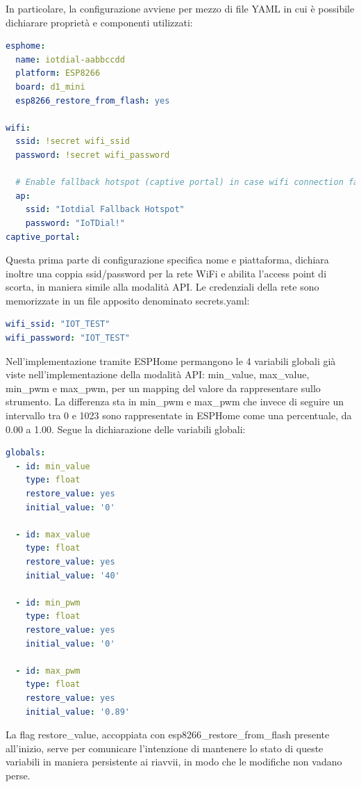 \documentclass[12pt,a4paper]{report}
\begin{document}
In particolare, la configurazione avviene per mezzo di file YAML in cui è possibile dichiarare proprietà e componenti utilizzati:

\begin{lstlisting}[language=yaml]
esphome:
  name: iotdial-aabbccdd
  platform: ESP8266
  board: d1_mini
  esp8266_restore_from_flash: yes

wifi:
  ssid: !secret wifi_ssid
  password: !secret wifi_password

  # Enable fallback hotspot (captive portal) in case wifi connection fails
  ap:
    ssid: "Iotdial Fallback Hotspot"
    password: "IoTDial!"
captive_portal:
\end{lstlisting}
Questa prima parte di configurazione specifica nome e piattaforma, dichiara inoltre una coppia ssid/password per la rete WiFi
e abilita l'access point di scorta, in maniera simile alla modalità API. Le credenziali della rete sono memorizzate in un file apposito
denominato secrets.yaml:
\begin{lstlisting}[language=yaml]
wifi_ssid: "IOT_TEST"
wifi_password: "IOT_TEST"
\end{lstlisting}

Nell'implementazione tramite ESPHome permangono le 4 variabili globali già viste nell'implementazione della modalità API:
min_value, max_value, min_pwm e max_pwm, per un mapping del valore da rappresentare sullo strumento.
La differenza sta in min_pwm e max_pwm che invece di seguire un intervallo tra 0 e 1023 sono rappresentate in ESPHome come una
percentuale, da 0.00 a 1.00. Segue la dichiarazione delle variabili globali:
\begin{lstlisting}[language=yaml]
globals:
  - id: min_value
    type: float
    restore_value: yes
    initial_value: '0'

  - id: max_value
    type: float
    restore_value: yes
    initial_value: '40'

  - id: min_pwm
    type: float
    restore_value: yes
    initial_value: '0'

  - id: max_pwm
    type: float
    restore_value: yes
    initial_value: '0.89'
\end{lstlisting}
La flag restore_value, accoppiata con esp8266_restore_from_flash presente all'inizio, serve per comunicare l'intenzione di mantenere
lo stato di queste variabili in maniera persistente ai riavvii, in modo che le modifiche non vadano perse.
\end{document}
